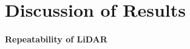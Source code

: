 \chapter{Discussion of Results}
\label{chap:results}






\subsubsection{Repeatability of LiDAR}
\label{sec:markerdetectionaccuracy}